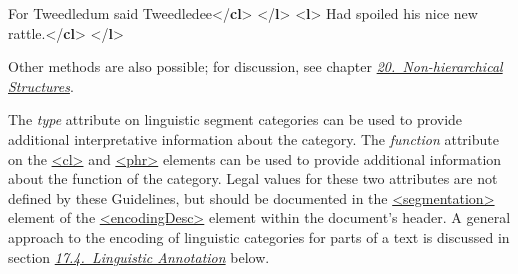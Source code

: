 \begin{shaded}
For Tweedledum said\mbox{}\newline 
{}Tweedledee{</\textbf{cl}>}\mbox{}\newline 
{}\mbox{}\newline 
{</\textbf{l}>}\mbox{}\newline 
{<\textbf{l}>}\mbox{}\newline 
{}\mbox{}\newline 
\hspace*{1em}Had spoiled his nice new rattle.{</\textbf{cl}>}\mbox{}\newline 
{}\mbox{}\newline 
{</\textbf{l}>}\end{shaded}\egroup\par \noindent  Other methods are also possible; for discussion, see chapter \textit{\hyperref[NH]{20.\ Non-hierarchical Structures}}.\par
The {\itshape type} attribute on linguistic segment categories can be used to provide additional interpretative information about the category. The {\itshape function} attribute on the \hyperref[TEI.cl]{<cl>} and \hyperref[TEI.phr]{<phr>} elements can be used to provide additional information about the function of the category. Legal values for these two attributes are not defined by these Guidelines, but should be documented in the \hyperref[TEI.segmentation]{<segmentation>} element of the \hyperref[TEI.encodingDesc]{<encodingDesc>} element within the document's header. A general approach to the encoding of linguistic categories for parts of a text is discussed in section \textit{\hyperref[AILA]{17.4.\ Linguistic Annotation}} below.\par
